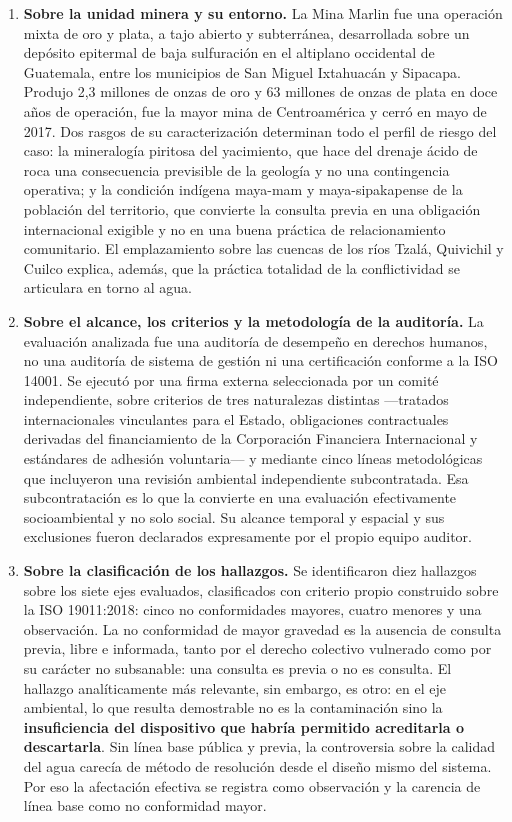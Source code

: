\begin{enumerate}

\item \textbf{Sobre la unidad minera y su entorno.} La Mina Marlin fue una
operación mixta de oro y plata, a tajo abierto y subterránea, desarrollada sobre
un depósito epitermal de baja sulfuración en el altiplano occidental de
Guatemala, entre los municipios de San Miguel Ixtahuacán y Sipacapa. Produjo 2,3
millones de onzas de oro y 63 millones de onzas de plata en doce años de
operación, fue la mayor mina de Centroamérica y cerró en mayo de 2017. Dos rasgos
de su caracterización determinan todo el perfil de riesgo del caso: la
mineralogía piritosa del yacimiento, que hace del drenaje ácido de roca una
consecuencia previsible de la geología y no una contingencia operativa; y la
condición indígena maya-mam y maya-sipakapense de la población del territorio,
que convierte la consulta previa en una obligación internacional exigible y no en
una buena práctica de relacionamiento comunitario. El emplazamiento sobre las
cuencas de los ríos Tzalá, Quivichil y Cuilco explica, además, que la práctica
totalidad de la conflictividad se articulara en torno al agua.

\item \textbf{Sobre el alcance, los criterios y la metodología de la auditoría.}
La evaluación analizada fue una auditoría de desempeño en derechos humanos, no una
auditoría de sistema de gestión ni una certificación conforme a la ISO 14001. Se
ejecutó por una firma externa seleccionada por un comité independiente, sobre
criterios de tres naturalezas distintas —tratados internacionales vinculantes para
el Estado, obligaciones contractuales derivadas del financiamiento de la
Corporación Financiera Internacional y estándares de adhesión voluntaria— y
mediante cinco líneas metodológicas que incluyeron una revisión ambiental
independiente subcontratada. Esa subcontratación es lo que la convierte en una
evaluación efectivamente socioambiental y no solo social. Su alcance temporal y
espacial y sus exclusiones fueron declarados expresamente por el propio equipo
auditor.

\item \textbf{Sobre la clasificación de los hallazgos.} Se identificaron diez
hallazgos sobre los siete ejes evaluados, clasificados con criterio propio
construido sobre la ISO 19011:2018: cinco no conformidades mayores, cuatro
menores y una observación. La no conformidad de mayor gravedad es la ausencia de
consulta previa, libre e informada, tanto por el derecho colectivo vulnerado como
por su carácter no subsanable: una consulta es previa o no es consulta. El
hallazgo analíticamente más relevante, sin embargo, es otro: en el eje ambiental,
lo que resulta demostrable no es la contaminación sino la
\textbf{insuficiencia del dispositivo que habría permitido acreditarla o
descartarla}. Sin línea base pública y previa, la controversia sobre la calidad
del agua carecía de método de resolución desde el diseño mismo del sistema. Por
eso la afectación efectiva se registra como observación y la carencia de línea
base como no conformidad mayor.


\end{enumerate}
